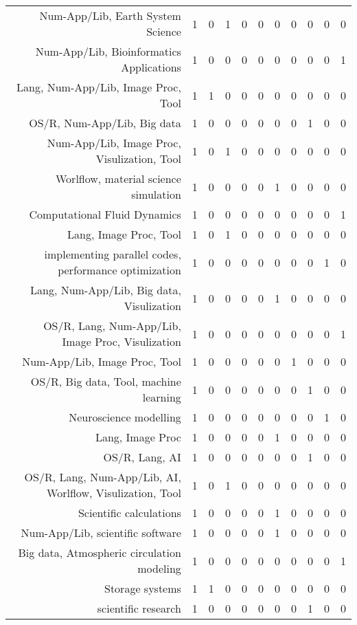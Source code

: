 {\begin{landscape}
\begin{longtable}[htb]{r|c|c|c|c|c|c|c|c|c|c}
{Num-App/Lib, Earth System Science} & 1 & 0 & 1 & 0 & 0 & 0 & 0 & 0 & 0 & 0 \\%
{Num-App/Lib, Bioinformatics Applications} & 1 & 0 & 0 & 0 & 0 & 0 & 0 & 0 & 0 & 1 \\%
{Lang, Num-App/Lib, Image Proc, Tool} & 1 & 1 & 0 & 0 & 0 & 0 & 0 & 0 & 0 & 0 \\%
{OS/R, Num-App/Lib, Big data} & 1 & 0 & 0 & 0 & 0 & 0 & 0 & 1 & 0 & 0 \\%
{Num-App/Lib, Image Proc, Visulization, Tool} & 1 & 0 & 1 & 0 & 0 & 0 & 0 & 0 & 0 & 0 \\%
{Worlflow, material science simulation} & 1 & 0 & 0 & 0 & 0 & 1 & 0 & 0 & 0 & 0 \\%
{Computational Fluid Dynamics} & 1 & 0 & 0 & 0 & 0 & 0 & 0 & 0 & 0 & 1 \\%
{Lang, Image Proc, Tool} & 1 & 0 & 1 & 0 & 0 & 0 & 0 & 0 & 0 & 0 \\%
{implementing parallel codes, performance optimization} & 1 & 0 & 0 & 0 & 0 & 0 & 0 & 0 & 1 & 0 \\%
{Lang, Num-App/Lib, Big data, Visulization} & 1 & 0 & 0 & 0 & 0 & 1 & 0 & 0 & 0 & 0 \\%
{OS/R, Lang, Num-App/Lib, Image Proc, Visulization} & 1 & 0 & 0 & 0 & 0 & 0 & 0 & 0 & 0 & 1 \\%
{Num-App/Lib, Image Proc, Tool} & 1 & 0 & 0 & 0 & 0 & 0 & 1 & 0 & 0 & 0 \\%
{OS/R, Big data, Tool, machine learning} & 1 & 0 & 0 & 0 & 0 & 0 & 0 & 1 & 0 & 0 \\%
{Neuroscience modelling} & 1 & 0 & 0 & 0 & 0 & 0 & 0 & 0 & 1 & 0 \\%
{Lang, Image Proc} & 1 & 0 & 0 & 0 & 0 & 1 & 0 & 0 & 0 & 0 \\%
{OS/R, Lang, AI} & 1 & 0 & 0 & 0 & 0 & 0 & 0 & 1 & 0 & 0 \\%
{OS/R, Lang, Num-App/Lib, AI, Worlflow, Visulization, Tool} & 1 & 0 & 1 & 0 & 0 & 0 & 0 & 0 & 0 & 0 \\%
{Scientific calculations} & 1 & 0 & 0 & 0 & 0 & 1 & 0 & 0 & 0 & 0 \\%
{Num-App/Lib, scientific software} & 1 & 0 & 0 & 0 & 0 & 1 & 0 & 0 & 0 & 0 \\%
{Big data, Atmospheric circulation modeling} & 1 & 0 & 0 & 0 & 0 & 0 & 0 & 0 & 0 & 1 \\%
{Storage systems} & 1 & 1 & 0 & 0 & 0 & 0 & 0 & 0 & 0 & 0 \\%
{scientific research} & 1 & 0 & 0 & 0 & 0 & 0 & 0 & 1 & 0 & 0 \\%

\end{longtable}
\end{landscape}}
